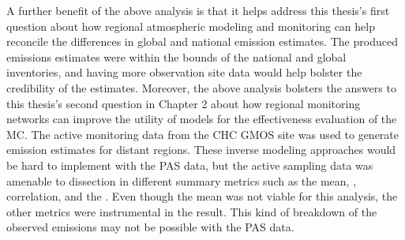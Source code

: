   \begin{flushleft}
  A further benefit of the above analysis is that it helps address this thesis's first question about how regional atmospheric modeling and monitoring can help reconcile the differences in global and national emission estimates. The produced emissions estimates were within the bounds of the national and global inventories, and having more observation site data would help bolster the credibility of the estimates. Moreover, the above analysis bolsters the answers to this thesis's second question in Chapter 2 about how regional monitoring networks can improve the utility of models for the effectiveness evaluation of the MC. The active monitoring data from the CHC GMOS site was used to generate emission estimates for distant regions. These inverse modeling approaches would be hard to implement with the PAS data, but the active sampling data was amenable to dissection in different summary metrics such as the mean, \iq, correlation, and the \nft. Even though the mean was not viable for this analysis, the other metrics were instrumental in the result. This kind of breakdown of the observed emissions may not be possible with the PAS data.
\end{flushleft}

\newpage
